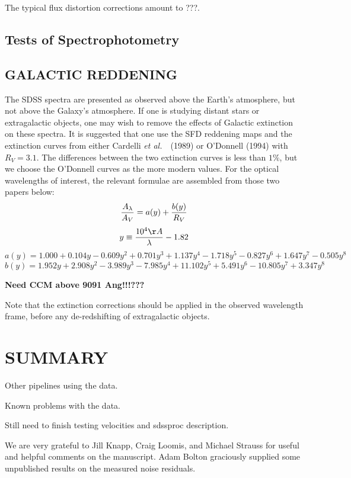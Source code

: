 \documentclass[12pt,preprint]{aastex}
\newcommand{\etal}{{\it et al.}~}
\begin{document}
The typical flux distortion corrections amount to ???.

\subsection{Tests of Spectrophotometry}


\subsection{GALACTIC REDDENING}

The SDSS spectra are presented as observed above the Earth's
atmosphere, but not above the Galaxy's atmosphere.
If one is studying distant stars or extragalactic objects,
one may wish to remove the effects of Galactic extinction
on these spectra.  It is suggested that one use the SFD reddening
maps and the extinction curves from either Cardelli \etal\ (1989)
or O'Donnell (1994) with $R_V=3.1$.  The differences between the
two extinction curves is less than $1\%$, but we choose the O'Donnell
curves as the more modern values.  For the optical wavelengths
of interest, the relevant formulae are
assembled from those two papers below:
$$ {A_\lambda \over A_V} = a(y) + {b(y)\over R_V} $$
$$ y \equiv {10^4\AA \over \lambda} - 1.82 $$
$$ a(y) = 1.000 + 0.104 y - 0.609 y^2 + 0.701 y^3 + 1.137 y^4
  - 1.718 y^5 - 0.827 y^6 + 1.647 y^7 - 0.505 y^8 $$
$$ b(y) = 1.952 y + 2.908 y^2 - 3.989 y^3 - 7.985 y^4
  + 11.102 y^5 + 5.491 y^6 - 10.805 y^7 + 3.347 y^8 $$

{\bf Need CCM above 9091 Ang!!!???}

Note that the extinction corrections should be applied in the
observed wavelength frame, before any de-redshifting of extragalactic objects.


\section{SUMMARY}

Other pipelines using the data.

Known problems with the data.

Still need to finish testing velocities and sdssproc description.

\bigskip
We are very grateful to Jill Knapp, Craig Loomis, and Michael Strauss for
useful and helpful comments on the manuscript.  Adam Bolton 
graciously supplied some unpublished results on the measured noise residuals.
\end{document}
